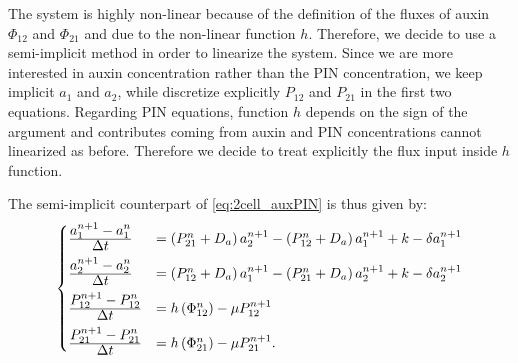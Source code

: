 The system is highly non-linear because of the definition of the fluxes of auxin $\Phi_{12}$ and $\Phi_{21}$ and due to the non-linear function $h$. Therefore, we decide to use a semi-implicit method in order to linearize the system. Since we are more interested in auxin concentration rather than the PIN concentration, we keep implicit $a_1$ and $a_2$, while discretize explicitly $P_{12}$ and $P_{21}$ in the first two equations. Regarding PIN equations, function $h$ depends on the sign of the argument and contributes coming from auxin and PIN concentrations cannot linearized as before. Therefore we decide to treat explicitly the flux input inside $h$ function.

The semi-implicit counterpart of \eqref{eq:2cell_auxPIN} is thus given by:
\begin{equation}\begin{aligned}
\begin{cases}
  {\displaystyle a_1^{n+1} - a_1^n\over\displaystyle \Delta t} & = \left( P_{21}^{n} + D_a \right) a_2^{n+1} - \left( P_{12}^{n} + D_a \right) a_1^{n+1} + k - \delta a_1^{n+1} \\[6pt]
  {\displaystyle a_2^{n+1} - a_2^n \over\displaystyle \Delta t} & = \left( P_{12}^{n} + D_a \right) a_1^{n+1} - \left( P_{21}^{n} + D_a \right) a_2^{n+1} + k - \delta a_2^{n+1} \\[6pt]
  {\displaystyle P_{12}^{n+1} - P_{12}^{n} \over\displaystyle \Delta t} & = h\left(\Phi_{12}^{n}\right) - \mu P_{12}^{n+1} \\[6pt]
  {\displaystyle P_{21}^{n+1} - P_{21}^{n} \over\displaystyle \Delta t} & = h\left(\Phi_{21}^{n}\right) - \mu P_{21}^{n+1}.
\end{cases}
\end{aligned} \end{equation}

